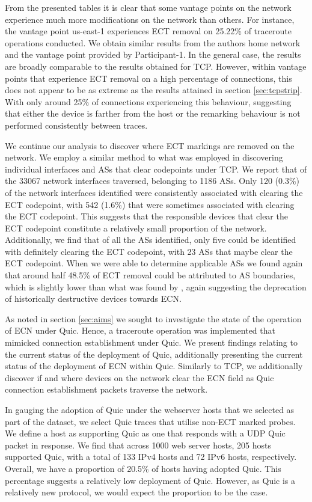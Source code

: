 \documentclass{l4proj}
\begin{document}
From the presented tables it is clear that some vantage points on the network experience much more modifications on the network than others. For instance, the vantage point us-east-1 experiences ECT removal on 25.22\% of traceroute operations conducted. We obtain similar results from the authors home network and the vantage point provided by Participant-1. In the general case, the results are broadly comparable to the results obtained for TCP. However, within vantage points that experience ECT removal on a high percentage of connections, this does not appear to be as extreme as the results attained in section \ref{sec:tcpstrip}. With only around 25\% of connections experiencing this behaviour, suggesting that either the device is farther from the host or the remarking behaviour is not performed consistently between traces.

We continue our analysis to discover where ECT markings are removed on the network. We employ a similar method to what was employed in discovering individual interfaces and ASs that clear codepoints under TCP. We report that of the 33067 network interfaces traversed, belonging to 1186 ASs. Only 120 (0.3\%) of the network interfaces identified were consistently associated with clearing the ECT codepoint, with 542 (1.6\%) that were sometimes associated with clearing the ECT codepoint. This suggests that the responsible devices that clear the ECT codepoint constitute a relatively small proportion of the network. Additionally, we find that of all the ASs identified, only five could be identified with definitely clearing the ECT codepoint, with 23 ASs that maybe clear the ECT codepoint. When we were able to determine applicable ASs we found again that around half 48.5\% of ECT removal could be attributed to AS boundaries, which is slightly lower than what was found by \cite{mcquistin_is_2015}, again suggesting the deprecation of historically destructive devices towards ECN.


As noted in section \ref{sec:aims} we sought to investigate the state of the operation of ECN under Quic. Hence, a traceroute operation was implemented that mimicked connection establishment under Quic. We present findings relating to the current status of the deployment of Quic, additionally presenting the current status of the deployment of ECN within Quic. Similarly to TCP, we additionally discover if and where devices on the network clear the ECN field as Quic connection establishment packets traverse the network.

In gauging the adoption of Quic under the webserver hosts that we selected as part of the dataset, we select Quic traces that utilise non-ECT marked probes. We define a host as supporting Quic as one that responds with a UDP Quic packet in response. We find that across 1000 web server hosts, 205 hosts supported Quic, with a total of 133 IPv4 hosts and 72 IPv6 hosts, respectively. Overall, we have a proportion of 20.5\% of hosts having adopted Quic. This percentage suggests a relatively low deployment of Quic. However, as Quic is a relatively new protocol, we would expect the proportion to be the case.
\end{document}
